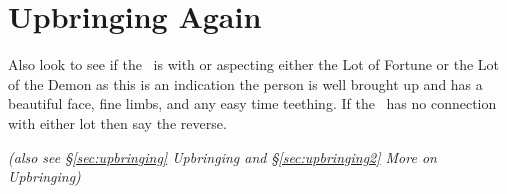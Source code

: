 \section{Upbringing Again}
\label{sec:upbringing3}

Also look to see if the \Moon\, is with or aspecting either the Lot of Fortune or the Lot of the Demon as this is an indication the person is well brought up and has a beautiful face, fine limbs, and any easy time teething. If the \Moon\, has no connection with either lot then say the reverse.

\textsl{(also see \S\ref{sec:upbringing} Upbringing and \S\ref{sec:upbringing2} More on Upbringing)}